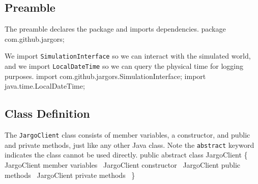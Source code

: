 \documentclass{article}
\def\nwendcode{\endtrivlist \endgroup}
\let\nwdocspar=\par
\begin{document}
\subsection{Preamble}
The preamble declares the package and imports dependencies.
\nwenddocs{}\endmoddef{}
package com.github.jargors;
\nwendcode{}\nwdocspar
We import {\tt{}SimulationInterface} so we can interact with the simulated world,
and we import {\tt{}LocalDateTime} so we can query the physical time for
logging purposes.
\nwenddocs{}\plusendmoddef
import com.github.jargors.SimulationInterface;
import java.time.LocalDateTime;
\nwendcode{}\nwdocspar

\subsection{Class Definition}
The {\tt{}JargoClient} class consists of member variables, a constructor, and public
and private methods, just like any other Java class. Note the {\tt{}abstract}
keyword indicates the class cannot be used directly.
\nwenddocs{}\endmoddef{}
public abstract class JargoClient \{
  \LA{}\code{}JargoClient\edoc{} member variables~{\nwtagstyle{}}\RA{}
  \LA{}\code{}JargoClient\edoc{} constructor~{\nwtagstyle{}}\RA{}
  \LA{}\code{}JargoClient\edoc{} public methods~{\nwtagstyle{}}\RA{}
  \LA{}\code{}JargoClient\edoc{} private methods~{\nwtagstyle{}}\RA{}
\}
\nwendcode{}\nwdocspar
\end{document}
